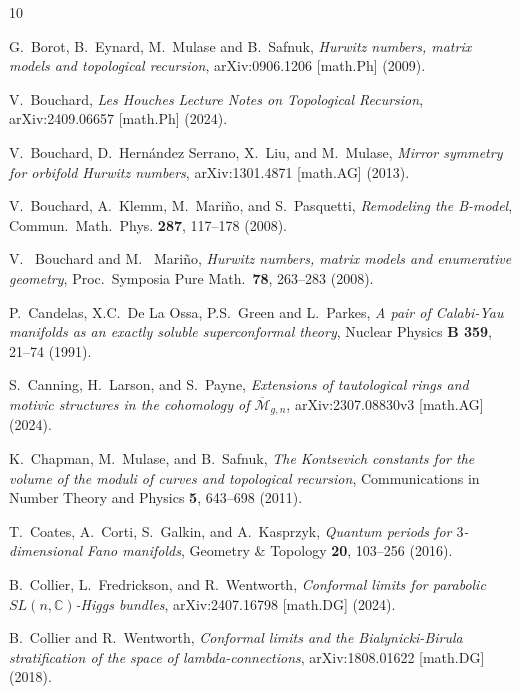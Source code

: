 \documentclass{amsart}
\theoremstyle{definition}
\numberwithin{equation}{section}
\numberwithin{figure}{section}
\newcommand{\Mbar}{{\overline{\mathcal{M}}}}
\newcommand{\bC}{{\mathbb{C}}}
\begin{document}
\begin{thebibliography}{10}
  


 G.~Borot, B.~Eynard,
M.~Mulase and B.~Safnuk, 
\emph{Hurwitz numbers, matrix models and 
topological recursion}, 	arXiv:0906.1206 [math.Ph] (2009).

V.~Bouchard, 
\emph{Les Houches Lecture Notes on Topological Recursion}, 
arXiv:2409.06657 [math.Ph] (2024).


V.~Bouchard, D.~Hern\'andez Serrano, 
X.~Liu, and M.~Mulase,
\emph{Mirror symmetry for orbifold Hurwitz numbers}, arXiv:1301.4871 [math.AG] (2013).





V.~Bouchard, A.~Klemm, M.~Mari\~no, and S.~Pasquetti,
\emph{Remodeling the {B}-model},
Commun.\ Math.\ Phys.
 \textbf{287}, 117--178 (2008).



V.~ Bouchard and M.~ Mari\~no, 
\emph{Hurwitz numbers, matrix models and enumerative geometry},
Proc.\ Symposia Pure Math.\ 
 \textbf{78}, 263--283 (2008).



P.~Candelas, X.C.~De La Ossa, P.S.~Green  and L.~Parkes,
\emph{A pair of Calabi-Yau manifolds as an exactly soluble superconformal theory},
Nuclear Physics \textbf{B
 359}, 21--74 (1991).


S.~Canning, H.~Larson, and S.~Payne,
\emph{Extensions of tautological rings and motivic structures in the cohomology of  $\Mbar_{g,n}$},
 arXiv:2307.08830v3 [math.AG] (2024).


K.~Chapman, M.~Mulase, and B.~Safnuk,
\emph{The Kontsevich constants for the volume of the moduli of curves and topological recursion},  Communications in Number Theory and Physics 
\textbf{5}, 643--698 (2011).

T.~Coates, A.~Corti, S.~Galkin, and A.~Kasprzyk,
\emph{Quantum periods for $3$-dimensional Fano manifolds},
Geometry \& Topology \textbf{20}, 103--256 (2016).


B.~Collier, L.~Fredrickson, and R.~Wentworth,
\emph{Conformal limits for parabolic $SL(n,\bC)$-Higgs bundles},
 	arXiv:2407.16798 [math.DG] (2024).


 B.~Collier and R.~Wentworth,
 \emph{Conformal limits and the Bialynicki-Birula stratification of the space of lambda-connections},
 arXiv:1808.01622 [math.DG] (2018).



\end{thebibliography}
\end{document}
